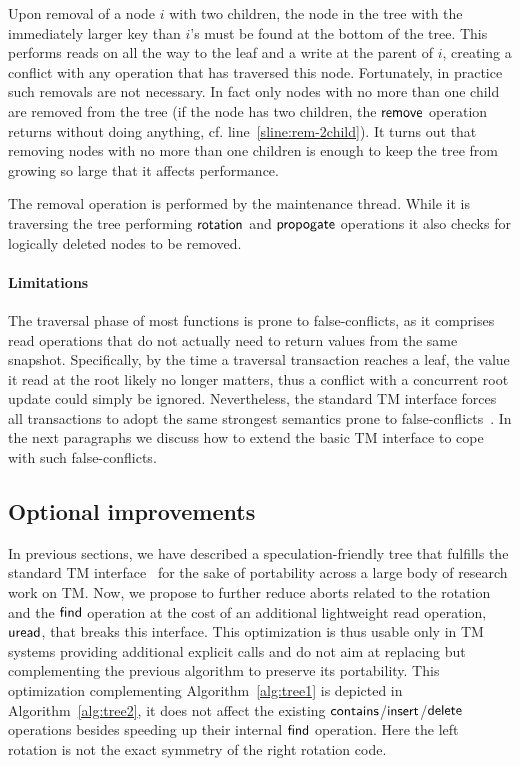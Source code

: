 Upon removal of a node $i$ with two children, the node in the tree with the immediately larger key than $i$'s must be found
at the bottom of the tree. This performs reads on all the way to the leaf and 
a write at the parent of $i$, creating a conflict with any operation that has traversed this node.
Fortunately, in practice such removals are not necessary.
In fact only nodes with no more than one child are removed from the tree 
(if the node has two children, the $\act{remove}$ operation returns without doing anything, cf. line~\ref{sline:rem-2child}).
It turns out that removing nodes with no more than one children is enough to keep the tree from growing so large that it affects performance.

The removal operation is performed by the maintenance thread. While it is traversing the tree performing $\act{rotation}$ and $\act{propogate}$ operations it
also checks for logically deleted nodes to be removed.

\paragraph{Limitations}
The traversal phase of most functions is prone to false-conflicts, as it comprises read operations that 
do not actually need to return values from the same snapshot. Specifically, by the time a traversal transaction 
reaches a leaf, the value it read at the root likely no longer matters, thus a conflict 
with a concurrent root update could simply be ignored. Nevertheless, the standard TM interface
forces all transactions to adopt the same strongest semantics prone to false-conflicts~\cite{GG11}.
In the next paragraphs we discuss how to extend the basic TM interface to cope with such false-conflicts. 


\subsection{Optional improvements}\label{sec:improvements}

In previous sections, we have described a speculation-friendly tree that fulfills the standard TM interface~\cite{abi} 
for the sake of portability across a large body of research work on TM.
Now, we propose to further reduce aborts related to the rotation and the $\act{find}$ operation at the cost of an additional 
lightweight read operation, 
$\act{uread}$, that breaks this interface. This optimization is thus usable only in TM systems providing additional 
explicit calls 
and do not aim at replacing but complementing the previous algorithm 
to preserve its portability. This optimization complementing Algorithm~\ref{alg:tree1} is depicted in Algorithm~\ref{alg:tree2}, it does not
affect the existing $\act{contains}$/$\act{insert}$/$\act{delete}$ operations besides speeding up their internal $\act{find}$ 
operation. Here the left rotation is not the exact symmetry of the right rotation code. 


